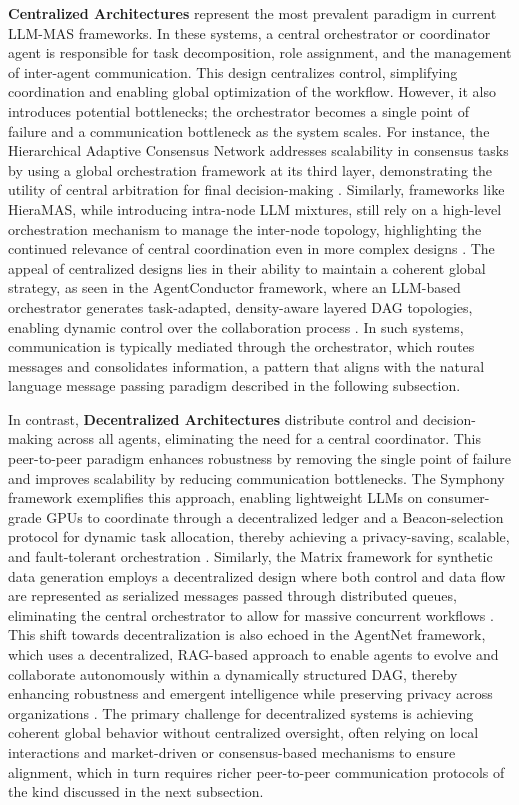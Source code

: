 \documentclass[11pt]{article}
\begin{document}
\textbf{Centralized Architectures} represent the most prevalent paradigm in current LLM-MAS frameworks. In these systems, a central orchestrator or coordinator agent is responsible for task decomposition, role assignment, and the management of inter-agent communication. This design centralizes control, simplifying coordination and enabling global optimization of the workflow. However, it also introduces potential bottlenecks; the orchestrator becomes a single point of failure and a communication bottleneck as the system scales. For instance, the Hierarchical Adaptive Consensus Network addresses scalability in consensus tasks by using a global orchestration framework at its third layer, demonstrating the utility of central arbitration for final decision-making \cite{ref51}. Similarly, frameworks like HieraMAS, while introducing intra-node LLM mixtures, still rely on a high-level orchestration mechanism to manage the inter-node topology, highlighting the continued relevance of central coordination even in more complex designs \cite{ref52}. The appeal of centralized designs lies in their ability to maintain a coherent global strategy, as seen in the AgentConductor framework, where an LLM-based orchestrator generates task-adapted, density-aware layered DAG topologies, enabling dynamic control over the collaboration process \cite{ref47}. In such systems, communication is typically mediated through the orchestrator, which routes messages and consolidates information, a pattern that aligns with the natural language message passing paradigm described in the following subsection.

In contrast, \textbf{Decentralized Architectures} distribute control and decision-making across all agents, eliminating the need for a central coordinator. This peer-to-peer paradigm enhances robustness by removing the single point of failure and improves scalability by reducing communication bottlenecks. The Symphony framework exemplifies this approach, enabling lightweight LLMs on consumer-grade GPUs to coordinate through a decentralized ledger and a Beacon-selection protocol for dynamic task allocation, thereby achieving a privacy-saving, scalable, and fault-tolerant orchestration \cite{ref53}. Similarly, the Matrix framework for synthetic data generation employs a decentralized design where both control and data flow are represented as serialized messages passed through distributed queues, eliminating the central orchestrator to allow for massive concurrent workflows \cite{ref54}. This shift towards decentralization is also echoed in the AgentNet framework, which uses a decentralized, RAG-based approach to enable agents to evolve and collaborate autonomously within a dynamically structured DAG, thereby enhancing robustness and emergent intelligence while preserving privacy across organizations \cite{ref55}. The primary challenge for decentralized systems is achieving coherent global behavior without centralized oversight, often relying on local interactions and market-driven or consensus-based mechanisms to ensure alignment, which in turn requires richer peer-to-peer communication protocols of the kind discussed in the next subsection.
\end{document}
